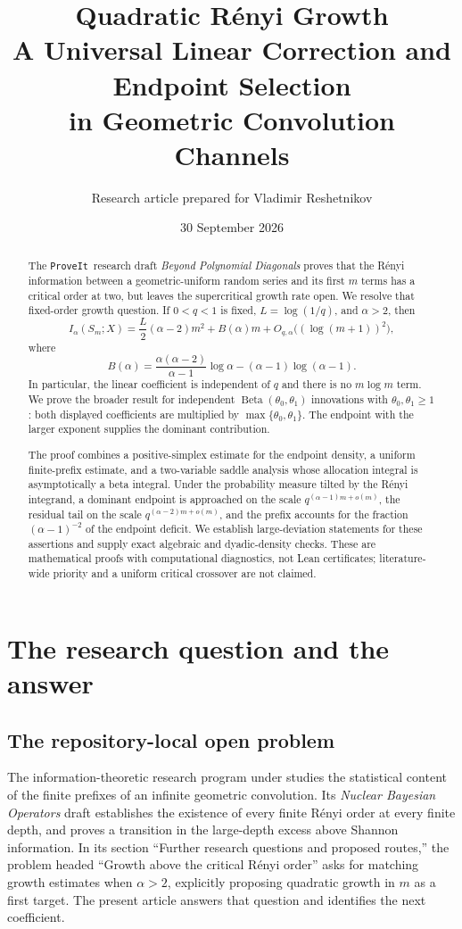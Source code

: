 \documentclass[11pt,a4paper]{article}
\title{\LARGE\bfseries Quadratic R\'enyi Growth\\[5pt]
\Large A Universal Linear Correction and Endpoint Selection\\
in Geometric Convolution Channels}
\author{Research article prepared for Vladimir Reshetnikov}
\date{30 September 2026}
\numberwithin{equation}{section}
\theoremstyle{definition}\newaliascnt{definition}{theorem}
\theoremstyle{remark}\newaliascnt{remark}{theorem}
\newcommand{\repo}{\texttt{ProveIt}}
\begin{document}
\maketitle
\begin{abstract}
The \repo\ research draft \emph{Beyond Polynomial Diagonals} proves that the
R\'enyi information between a geometric-uniform random series and its first
$m$ terms has a critical order at two, but leaves the supercritical growth
rate open. We resolve that fixed-order growth question. If $0<q<1$ is fixed,
$L=\log(1/q)$, and $\alpha>2$, then
\[
 I_\alpha(S_m;X)=\frac{L}{2}(\alpha-2)m^2+B(\alpha)m
                  +O_{q,\alpha}\bigl((\log(m+1))^2\bigr),
\]
where
\[
 B(\alpha)=\frac{\alpha(\alpha-2)}{\alpha-1}\log\alpha
                  -(\alpha-1)\log(\alpha-1).
\]
In particular, the linear coefficient is independent of $q$ and there is no
$m\log m$ term. We prove the broader result for independent
$\operatorname{Beta}(\theta_0,\theta_1)$ innovations with
$\theta_0,\theta_1\ge1$: both displayed coefficients are multiplied by
$\max\{\theta_0,\theta_1\}$. The endpoint with the larger exponent supplies the
dominant contribution.

The proof combines a positive-simplex estimate for the endpoint density,
a uniform finite-prefix estimate, and a two-variable saddle analysis whose
allocation integral is asymptotically a beta integral. Under the probability
measure tilted by the R\'enyi integrand, a dominant endpoint is approached on
the scale $q^{(\alpha-1)m+o(m)}$, the residual tail on the scale
$q^{(\alpha-2)m+o(m)}$, and the prefix accounts for the fraction
$(\alpha-1)^{-2}$ of the endpoint deficit. We establish large-deviation
statements for these assertions and supply exact algebraic and dyadic-density
checks. These are mathematical proofs with computational diagnostics, not Lean
certificates; literature-wide priority and a uniform critical crossover are
not claimed.
\end{abstract}
\newpage
\tableofcontents
\newpage

\section{The research question and the answer}
\label{sec:introduction}

\subsection{The repository-local open problem}
The information-theoretic research program under
studies the statistical content of the finite prefixes of an infinite
geometric convolution. Its \emph{Nuclear Bayesian Operators} draft
\cite{prior} establishes the existence of every finite R\'enyi order at every
finite depth, and proves a transition in the large-depth excess above Shannon
information. In its section ``Further research questions and proposed
routes,'' the problem headed ``Growth above the critical R\'enyi order'' asks
for matching growth estimates when $\alpha>2$, explicitly proposing quadratic
growth in $m$ as a first target. The present article answers that question and
identifies the next coefficient.
\end{document}
